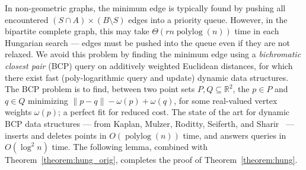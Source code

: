 \documentclass[11pt]{article}
\def\polylog{\mathop{\mathrm{polylog}}}
\theoremstyle{plain}
\begin{document}
In non-geometric graphs, the minimum edge is typically found by pushing all 
encountered $(S \cap A) \times (B \setminus S)$ edges into a priority queue.
However, in the bipartite complete graph, this may take $\Theta(rn\polylog(n))$
time in each Hungarian search --- edges must be pushed into the queue even if 
they are not relaxed.
We avoid this problem by finding the minimum edge using a \emph{bichromatic 
closest pair} (BCP) query on additively weighted Euclidean distances,
for which there exist fast (poly-logarithmic query and update) dynamic data 
structures.
The BCP problem is to find, between two point sets 
$P, Q \subseteq \mathbb{R}^2$, the $p \in P$ and $q \in Q$ minimizing 
$\|p - q\| - \omega(p) + \omega(q)$, for some real-valued vertex weights 
$\omega(p)$; a perfect fit for reduced cost.
The state of the art for dynamic BCP data structures --- from Kaplan, Mulzer, 
Roditty, Seiferth, and Sharir~\cite{KMRSS17} --- inserts and deletes points in 
$O(\polylog(n))$ time, and answers queries in $O(\log^2 n)$ time.
The following lemma, combined with Theorem~\ref{theorem:hung_orig}, completes
the proof of Theorem~\ref{theorem:hung}.
\end{document}
